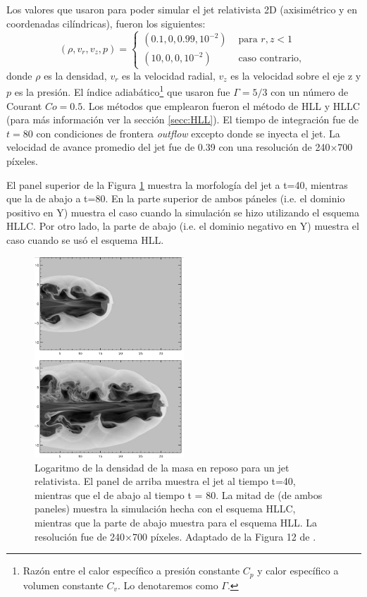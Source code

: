 \documentclass[12pt,a4paper]{book}
\begin{document}
Los valores que usaron para poder simular el jet relativista 2D (axisimétrico y en coordenadas cilíndricas), fueron los siguientes:
\begin{equation}
  \left(\rho, v_{r}, v_{z}, p\right)=\left\{\begin{array}{ll}
  \left(0.1,0,0.99,10^{-2}\right) & \text { para } r, z<1 \\
  \left(10,0,0,10^{-2}\right) & \text { caso contrario, }
  \end{array}\right.
\end{equation}
donde $\rho$ es la densidad, $v_r$ es la velocidad radial, $v_z$ es la velocidad sobre el eje z y $p$ es la presión. El índice adiabático\footnote{Razón entre el calor específico
a presión constante $C_p$ y calor específico a volumen constante $C_v$. Lo denotaremos como $\Gamma$.} que usaron fue $\Gamma = 5/3$ con un número de Courant $Co = 0.5$. 
Los métodos que emplearon fueron el método de HLL y HLLC (para más información ver la sección \ref{secc:HLL}). El tiempo de integración fue de $t = 80$ con condiciones de frontera \emph{outflow} excepto donde se 
inyecta el jet. La velocidad de avance promedio  del jet fue de 0.39 con una resolución de 240$\times$700 píxeles. 

El panel superior de la Figura \ref{fig:jet_mignone} muestra la morfología del jet a t=40, mientras que la de abajo a t=80. En la parte superior de ambos páneles (i.e. el dominio positivo en Y) muestra el 
caso cuando la simulación se hizo utilizando el esquema HLLC. Por otro lado, la parte de abajo (i.e. el dominio negativo en Y) muestra el caso cuando se usó el esquema HLL.
\begin{figure}
  \begin{center}
    \includegraphics[width=0.5\textwidth]{Figuras/capitulo_1/jet_mignone.png}
  \end{center}
  \caption{Logaritmo de la densidad de la masa en reposo para un jet relativista. El panel de arriba muestra el jet al tiempo t=40, mientras que el de abajo al tiempo t = 80.
  La mitad de  (de ambos paneles) muestra la simulación hecha con el esquema HLLC, mientras que la parte de abajo muestra para el esquema HLL.
  La resolución fue de 240$\times$700 píxeles. Adaptado de la Figura 12 de \citet{MB-HLLC-I}.}
  \label{fig:jet_mignone}
\end{figure}
\end{document}
